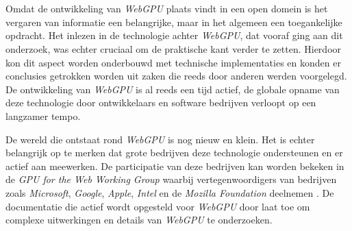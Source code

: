 
\chapter{}%
\label{ch:methodologie}


Omdat de ontwikkeling van \textit{WebGPU} plaats vindt in een open domein is het vergaren van informatie een belangrijke, maar in het algemeen een toegankelijke opdracht. Het inlezen in de technologie achter \textit{WebGPU}, dat vooraf ging aan dit onderzoek, was echter cruciaal om de praktische kant verder te zetten. Hierdoor kon dit aspect worden onderbouwd met technische implementaties en konden er conclusies getrokken worden uit zaken die reeds door anderen werden voorgelegd. De ontwikkeling van \textit{WebGPU} is al reeds een tijd actief, de globale opname van deze technologie door ontwikkelaars en software bedrijven verloopt op een langzamer tempo. 

\bigbreak{}

De wereld die ontstaat rond \textit{WebGPU} is nog nieuw en klein. Het is echter belangrijk op te merken dat grote bedrijven deze technologie ondersteunen en er actief aan meewerken. De participatie van deze bedrijven kan worden bekeken in de \textit{GPU for the Web Working Group} waarbij vertegenwoordigers van bedrijven zoals \textit{Microsoft}, \textit{Google}, \textit{Apple}, \textit{Intel} en de \textit{Mozilla Foundation} deelnemen \autocite{W3C2024a}. De documentatie die actief wordt opgesteld voor \textit{WebGPU} door \textcite{W3C2023} laat toe om complexe uitwerkingen en details van \textit{WebGPU} te onderzoeken. 

